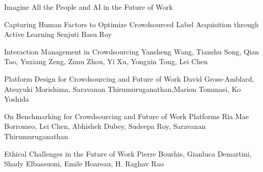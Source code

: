 \documentclass[11pt]{article}
\begin{document}
\begin{bulletin}
\begin{articlesection}{Imagine All the People and AI in the Future of Work}
%
%
%
\begin{article}
{Capturing Human Factors to Optimize Crowdsourced Label
Acquisition through Active Learning}
{Senjuti Basu Roy}

\end{article}


\begin{article}
{Interaction Management in Crowdsourcing}
{Yansheng Wang, Tianshu Song, Qian Tao, Yuxiang Zeng, Zimu Zhou,
Yi Xu, Yongxin Tong, Lei Chen}
\graphicspath{{submissions/yongxin}}

\end{article}


\begin{article}
{Platform Design for Crowdsourcing and Future of Work}
{David Gross-Amblard, Atsuyuki Morishima, Saravanan Thirumuruganathan,Marion Tommasi, Ko Yoshida}
\graphicspath{{submissions/atsuyuki/}}

\end{article}



\begin{article}
{On Benchmarking for Crowdsourcing and Future of Work Platforms}
{Ria Mae Borromeo, Lei Chen, Abhishek Dubey, Sudeepa Roy, Saravanan Thirumuruganathan}
\graphicspath{{submissions/lei/}}

\end{article}



\begin{article}
{Ethical Challenges in the Future of Work}
{Pierre Bourhis, Gianluca Demartini, Shady Elbassuoni, Emile Hoareau, H. Raghav Rao}
\graphicspath{{submissions/gianluca/}}

\end{article}



\end{articlesection}


\end{bulletin}
\end{document}
